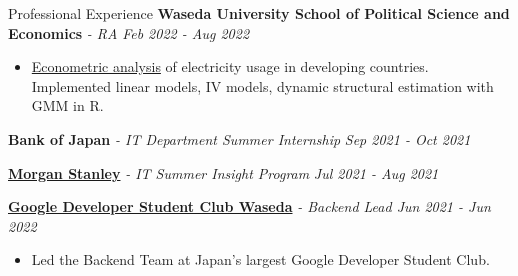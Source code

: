 \documentclass{resume} %
\begin{document}
\begin{rSection}{Professional Experience}
{\bf Waseda University School of Political Science and Economics} {\textit{ - RA }} \hfill {\em Feb 2022 - Aug 2022} 
\begin{itemize}
\item \uline{Econometric analysis} of electricity usage in developing countries. Implemented linear models, IV models, dynamic structural estimation with GMM in R. 
\end{itemize}

{\bf Bank of Japan}{\textit{ - IT Department Summer Internship}} \hfill {\em Sep 2021 - Oct 2021} 

{\bf \href{https://www.morganstanley.co.jp/ja}{Morgan Stanley}}\textit{ - IT Summer Insight Program} \hfill {\em Jul 2021 - Aug 2021} 

{ \bf\href{https://gdsc.community.dev/waseda-university/}{Google Developer Student Club Waseda}} \textit{ - Backend Lead \hfill {Jun 2021 - Jun 2022}}
\begin{itemize}
\item Led the Backend Team at Japan's largest Google Developer Student Club. %
\end{itemize}



\end{rSection}
\end{document}
